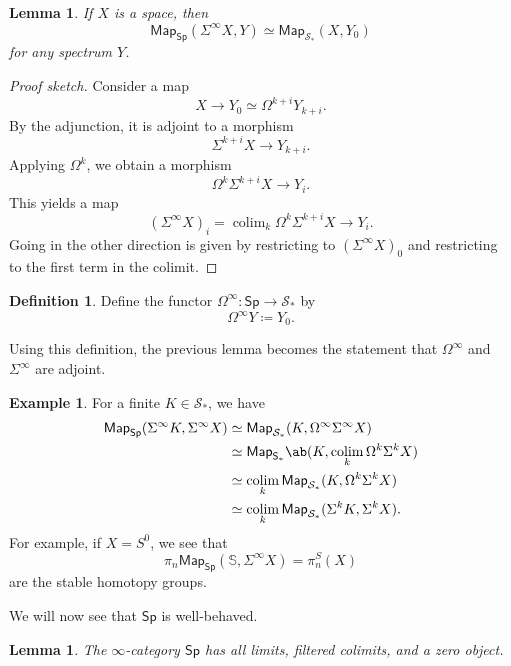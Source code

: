 \documentclass[10pt, oneside]{memoir}
\newtheorem{lem}[thm]{Lemma}
\theoremstyle{definition}
\newtheorem{defn}[thm]{Definition}
\newtheorem{exm}[thm]{Example}
\theoremstyle{remark}
\theoremstyle{plain}
\theoremstyle{definition}
\theoremstyle{remark}
\newcommand{\bS}{\mathbb{S}}
\newcommand{\mc}[1]{\mathcal{#1}}
\newcommand{\ms}[1]{\mathsf{#1}}
\newcommand{\1}{\mathbf{1}}
\newcommand{\2}{\mathbf{2}}
\newcommand{\3}{\mathbf{3}}
\DeclareMathOperator*{\colim}{colim}
\begin{document}
\begin{lem}
    If \(X \) is a space, then
    \[ \ms{Map}_{\ms{Sp}}(\Sigma^{\infty} X, Y) \simeq \ms{Map}_{\mc{S}_*} (X, Y_0) \]
    for any spectrum \(Y \).
\end{lem}

\begin{proof}[Proof sketch]
    Consider a map
    \[ X \to Y_0 \simeq \Omega^{k+i} Y_{k+i}. \]
    By the adjunction, it is adjoint to a morphism
    \[ \Sigma^{k+i} X \to Y_{k+i}. \]
    Applying \(\Omega^k \), we obtain a morphism
    \[ \Omega^k \Sigma^{k+i} X \to Y_i. \]
    This yields a map
    \[ (\Sigma^{\infty} X)_i = \colim_k \Omega^k \Sigma^{k+i} X \to Y_i. \]
    Going in the other direction is given by restricting to \((\Sigma^{\infty} X)_0 \) and restricting to the first term in the colimit.
\end{proof}

\begin{defn}
    Define the functor \(\Omega^{\infty} \colon \ms{Sp} \to \mc{S}_* \) by
    \[ \Omega^{\infty} Y \coloneqq Y_0. \]
\end{defn}

Using this definition, the previous lemma becomes the statement that \(\Omega^{\infty} \) and \(\Sigma^{\infty} \) are adjoint.

\begin{exm}
    For a finite \(K \in \mc{S}_* \), we have
    \begin{align*}
        \ms{Map}_{\ms{Sp}}(\Sigma^{\infty} K, \Sigma^{\infty} X) &\simeq \ms{Map}_{\mc{S}_*}(K, \Omega^{\infty} \Sigma^{\infty} X) \\
        &\simeq \ms{Map}_{\ms{S}_*} \ab(K, \colim_k \Omega^k\Sigma^k X) \\
        &\simeq \colim_k \ms{Map}_{\mc{S}_*} (K, \Omega^k \Sigma^k X) \\
        &\simeq \colim_k \ms{Map}_{\mc{S}_*} (\Sigma^k K, \Sigma^k X).
    \end{align*}
    For example, if \(X = S^0 \), we see that
    \[ \pi_n \ms{Map}_{\ms{Sp}}(\bS, \Sigma^{\infty} X) = \pi_n^S(X) \]
    are the stable homotopy groups.
\end{exm}

We will now see that \(\ms{Sp} \) is well-behaved.

\begin{lem}
    The \(\infty \)-category \(\ms{Sp} \) has all limits, filtered colimits, and a zero object.
\end{lem}
\end{document}
